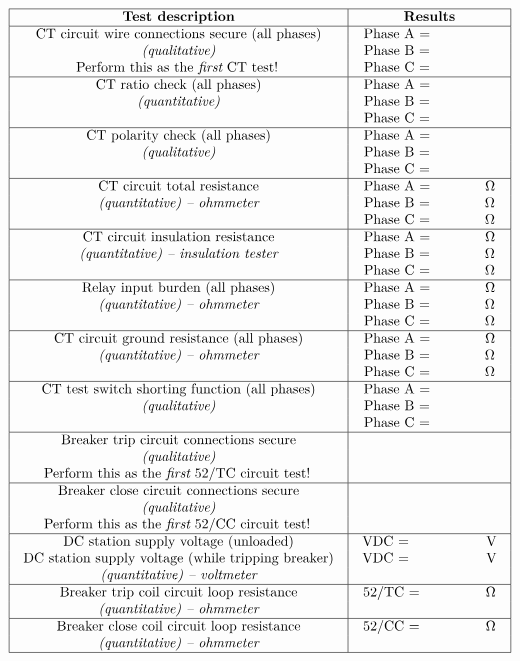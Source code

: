 $$\vbox{\offinterlineskip
\halign{\strut
\vrule \quad\hfil # \ \hfil & 
\vrule \quad\hfil # \ \hfil \vrule \cr
\noalign{\hrule}
%
{\bf Test description} & {\bf Results} \cr
%
\noalign{\hrule}
%
CT circuit wire connections secure (all phases) & Phase A = \hskip 50pt \cr
{\it (qualitative)} & Phase B = \hskip 50pt \cr
Perform this as the {\it first} CT test! & Phase C = \hskip 50pt \cr
%
\noalign{\hrule}
%
CT ratio check (all phases) & Phase A = \hskip 50pt \cr
{\it (quantitative)} & Phase B = \hskip 50pt \cr
 & Phase C = \hskip 50pt \cr
%
\noalign{\hrule}
%
CT polarity check (all phases) & Phase A = \hskip 50pt \cr
{\it (qualitative)} & Phase B = \hskip 50pt \cr
 & Phase C = \hskip 50pt \cr
%
\noalign{\hrule}
%
CT circuit total resistance & Phase A = \hskip 36pt $\Omega$ \cr
{\it (quantitative) -- ohmmeter} & Phase B = \hskip 36pt $\Omega$ \cr
 & Phase C = \hskip 36pt $\Omega$ \cr
%
\noalign{\hrule}
%
CT circuit insulation resistance & Phase A = \hskip 36pt $\Omega$ \cr
{\it (quantitative) -- insulation tester} & Phase B = \hskip 36pt $\Omega$ \cr
 & Phase C = \hskip 36pt $\Omega$ \cr
%
\noalign{\hrule}
%
Relay input burden (all phases) & Phase A = \hskip 36pt $\Omega$ \cr
{\it (quantitative) -- ohmmeter} & Phase B = \hskip 36pt $\Omega$ \cr
 & Phase C = \hskip 36pt $\Omega$ \cr
%
\noalign{\hrule}
%
CT circuit ground resistance (all phases) & Phase A = \hskip 36pt $\Omega$ \cr
{\it (quantitative) -- ohmmeter} & Phase B = \hskip 36pt $\Omega$ \cr
 & Phase C = \hskip 36pt $\Omega$ \cr
%
\noalign{\hrule}
%
CT test switch shorting function (all phases) & Phase A = \hskip 50pt \cr
{\it (qualitative)} & Phase B = \hskip 50pt \cr
 & Phase C = \hskip 50pt \cr
%
\noalign{\hrule}
%
Breaker trip circuit connections secure &  \cr
{\it (qualitative)} &  \cr
Perform this as the {\it first} 52/TC circuit test! &  \cr
%
\noalign{\hrule}
%
Breaker close circuit connections secure &  \cr
{\it (qualitative)} &  \cr
Perform this as the {\it first} 52/CC circuit test! &  \cr
%
\noalign{\hrule}
%
DC station supply voltage (unloaded) & VDC = \hskip 52pt V \cr
DC station supply voltage (while tripping breaker) & VDC = \hskip 52pt V \cr
{\it (quantitative) -- voltmeter} &  \cr
%
\noalign{\hrule}
%
Breaker trip coil circuit loop resistance & 52/TC = \hskip 44pt $\Omega$ \cr
{\it (quantitative) -- ohmmeter} &  \cr
%
\noalign{\hrule}
%
Breaker close coil circuit loop resistance & 52/CC = \hskip 44pt $\Omega$ \cr
{\it (quantitative) -- ohmmeter} &  \cr
%
\noalign{\hrule}
} %
}$$ %

